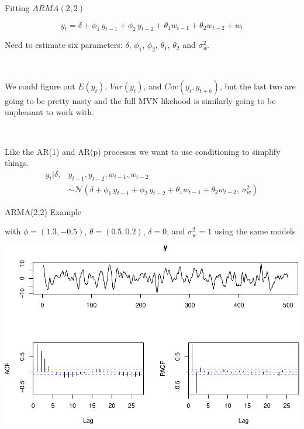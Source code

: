 \documentclass[11pt,ignorenonframetext,]{beamer}
\let\oldShaded\Shaded
\let\endoldShaded\endShaded
\let\oldverbatim\verbatim
\let\endoldverbatim\endverbatim
\newcommand{\tinyoutput}{
  \renewenvironment{Shaded}{\tiny\begin{spacing}{0.9}\oldShaded}{\endoldShaded\end{spacing}}
  \renewenvironment{verbatim}{\tiny\begin{spacing}{0.9}\oldverbatim}{\endoldverbatim\end{spacing}}
}
\begin{document}
\begin{frame}[t]{%
\protect\hypertarget{fitting-arma22}{%
Fitting \(ARMA(2,2)\)}}

\[ y_t = \delta + \phi_1 \, y_{t-1} + \phi_2 \, y_{t-2} + \theta_1 w_{t-1} + \theta_2 w_{t-2} + w_t \]

Need to estimate six parameters: \(\delta\), \(\phi_1\), \(\phi_2\),
\(\theta_1\), \(\theta_2\) and \(\sigma_w^2\).

\pause

\(~\)

We could figure out \(E(y_t)\), \(Var(y_t)\), and \(Cov(y_t, y_{t+h})\),
but the last two are going to be pretty nasty and the full MVN likehood
is similarly going to be unpleasant to work with.

\pause

\(~\)

Like the AR(1) and AR(p) processes we want to use conditioning to
simplify things. \tinyoutput \[
\begin{aligned}
y_t | \delta, &y_{t-1}, y_{t-2}, w_{t-1}, w_{t-2} \\ 
&\sim \mathcal{N}(\delta + \phi_1 \, y_{t-1} + \phi_2 \, y_{t-2} + \theta_1 w_{t-1} + \theta_2 w_{t-2},~\sigma_w^2) 
\end{aligned}
\]

\end{frame}

\begin{frame}{%
\protect\hypertarget{arma22-example}{%
ARMA(2,2) Example}}

with \(\phi = (1.3,-0.5)\), \(\theta = (0.5,0.2)\), \(\delta=0\), and
\(\sigma_w^2=1\) using the same models

\begin{center}\includegraphics[width=\textwidth]{Lec10_files/figure-beamer/unnamed-chunk-11-1} \end{center}

\end{frame}
\end{document}
